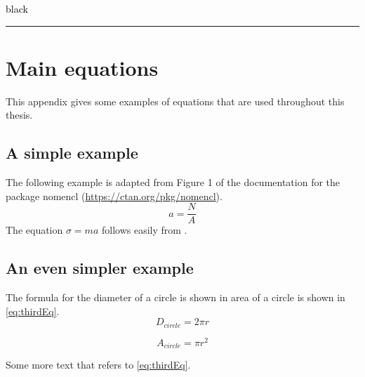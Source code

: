 \documentclass[nomenclature, english, bibtex]{kththesis}
\begin{document}
\textcolor{black}{black} {\color{black} \rule{\linewidth}{1mm} }

\ifnomenclature
\cleardoublepage
\chapter{Main equations}
\label{ch:NomenclatureExamples}
This appendix gives some examples of equations that are used throughout this thesis.
\section{A simple example}
The following example is adapted from Figure 1 of the documentation for the package nomencl (\url{https://ctan.org/pkg/nomencl}).
\begin{equation}\label{eq:mainEq}
a=\frac{N}{A}
\end{equation}
%
The equation $\sigma = m a$%
%
follows easily from .

\section{An even simpler example}
The formula for the diameter of a circle is shown in  area of a circle is shown in \cref{eq:thirdEq}.
\begin{equation}\label{eq:secondEq}
D_{circle}=2\pi r
\end{equation}
%
%

\begin{equation}\label{eq:thirdEq}
A_{circle}=\pi r^2
\end{equation}
%

Some more text that refers to \eqref{eq:thirdEq}.
\fi  %

\cleardoublepage
%


\cleardoublepage

\end{document}
